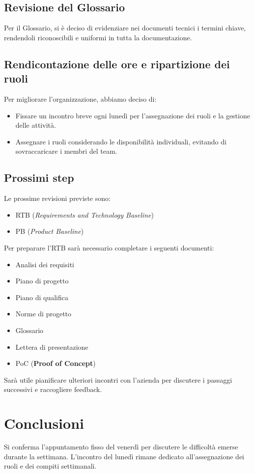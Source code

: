 \documentclass{article}
\begin{document}
\subsection{Revisione del Glossario} 
Per il Glossario, si è deciso di evidenziare nei documenti tecnici i termini chiave, rendendoli riconoscibili e uniformi in tutta la documentazione.

\subsection{Rendicontazione delle ore e ripartizione dei ruoli} 
Per migliorare l'organizzazione, abbiamo deciso di:
\begin{itemize}
    \item Fissare un incontro breve ogni lunedì per l'assegnazione dei ruoli e la gestione delle attività.
    \item Assegnare i ruoli considerando le disponibilità individuali, evitando di sovraccaricare i membri del team.
\end{itemize}

\subsection{Prossimi step} 
Le prossime revisioni previste sono:
\begin{itemize}
    \item RTB (\textit{Requirements and Technology Baseline})
    \item PB (\textit{Product Baseline})
\end{itemize}
Per preparare l'RTB sarà necessario completare i seguenti documenti:
\begin{itemize} 
    \item Analisi dei requisiti 
    \item Piano di progetto 
    \item Piano di qualifica 
    \item Norme di progetto 
    \item Glossario 
    \item Lettera di presentazione 
    \item PoC (\textbf{Proof of Concept}) 
\end{itemize}
Sarà utile pianificare ulteriori incontri con l'azienda per discutere i passaggi successivi e raccogliere feedback.

\section{Conclusioni}
Si conferma l'appuntamento fisso del venerdì per discutere le difficoltà emerse durante la settimana.
L'incontro del lunedì rimane dedicato all'assegnazione dei ruoli e dei compiti settimanali.
\end{document}
